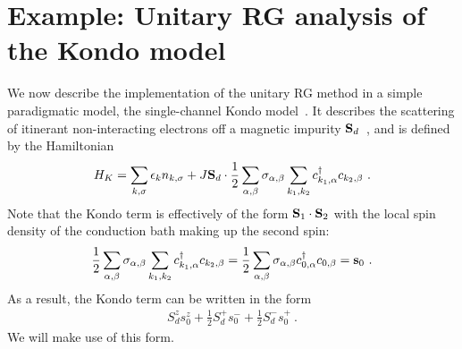 
\section{Example: Unitary RG analysis of the Kondo model}
We now describe the implementation of the unitary RG method in a simple paradigmatic model, the single-channel Kondo model~\cite{anirban_kondo}. It describes the scattering of itinerant non-interacting electrons off a magnetic impurity \({\bf S}_d\)~\cite{kondo1964resistance,anderson1970poor,wilson1975}, and is defined by the Hamiltonian
\begin{equation}\begin{aligned}
	H_K = \sum_{k,\sigma}\epsilon_k n_{k,\sigma} + J {\bf S}_d \cdot \frac{1}{2}\sum_{\alpha,\beta}{\bf \sigma}_{\alpha,\beta}\sum_{k_1, k_2} c^\dagger_{k_1,\alpha}c_{k_2,\beta}~.
\end{aligned}\end{equation}
Note that the Kondo term is effectively of the form \({\bf S}_1 \cdot {\bf S}_2\) with the local spin density of the conduction bath making up the second spin:
\begin{equation}\begin{aligned}
	\frac{1}{2}\sum_{\alpha,\beta}{\bf \sigma}_{\alpha,\beta}\sum_{k_1, k_2} c^\dagger_{k_1,\alpha}c_{k_2,\beta} = \frac{1}{2}\sum_{\alpha,\beta}{\bf \sigma}_{\alpha,\beta} c^\dagger_{0,\alpha}c_{0,\beta} = {\bf s}_0~.
\end{aligned}\end{equation}
As a result, the Kondo term can be written in the form
\begin{equation}\begin{aligned}
S_d^z s_0^z + \frac{1}{2}S_d^+ s_0^- + \frac{1}{2}S_d^- s_0^+~.
\end{aligned}\end{equation}
We will make use of this form.

